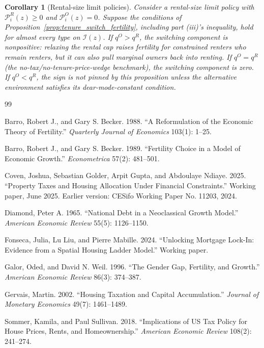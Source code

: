 \documentclass[11pt]{article}
\newtheorem{corollary}{Corollary}
\newcommand{\1}{\mathbf 1}
\begin{document}
\begin{corollary}[Rental-size limit policies]
\label{cor:switch_rental_size_limit}
Consider a rental-size limit policy with $\mathcal P_i^R(z)\ge0$ and $\mathcal P_i^O(z)=0$. Suppose the conditions of Proposition~\ref{prop:tenure_switch_fertility}, including part (iii)'s inequality, hold for almost every type on $\mathcal I(z)$. If $q^O>q^R$, the switching component is nonpositive: relaxing the rental cap raises fertility for constrained renters who remain renters, but it can also pull marginal owners back into renting. If $q^O=q^R$ (the no-tax/no-tenure-price-wedge benchmark), the switching component is zero. If $q^O<q^R$, the sign is not pinned by this proposition unless the alternative environment satisfies its dear-mode-constant condition.
\end{corollary}

\clearpage

\begin{thebibliography}{99}
\small

Barro, Robert J., and Gary S. Becker. 1988. ``A Reformulation of the Economic Theory of Fertility.'' \emph{Quarterly Journal of Economics} 103(1): 1--25.

Barro, Robert J., and Gary S. Becker. 1989. ``Fertility Choice in a Model of Economic Growth.'' \emph{Econometrica} 57(2): 481--501.

Coven, Joshua, Sebastian Golder, Arpit Gupta, and Abdoulaye Ndiaye. 2025. ``Property Taxes and Housing Allocation Under Financial Constraints.'' Working paper, June 2025. Earlier version: CESifo Working Paper No. 11203, 2024.

Diamond, Peter A. 1965. ``National Debt in a Neoclassical Growth Model.'' \emph{American Economic Review} 55(5): 1126--1150.

Fonseca, Julia, Lu Liu, and Pierre Mabille. 2024. ``Unlocking Mortgage Lock-In: Evidence from a Spatial Housing Ladder Model.'' Working paper.

Galor, Oded, and David N. Weil. 1996. ``The Gender Gap, Fertility, and Growth.'' \emph{American Economic Review} 86(3): 374--387.

Gervais, Martin. 2002. ``Housing Taxation and Capital Accumulation.'' \emph{Journal of Monetary Economics} 49(7): 1461--1489.

Sommer, Kamila, and Paul Sullivan. 2018. ``Implications of US Tax Policy for House Prices, Rents, and Homeownership.'' \emph{American Economic Review} 108(2): 241--274.

\end{thebibliography}
\end{document}
